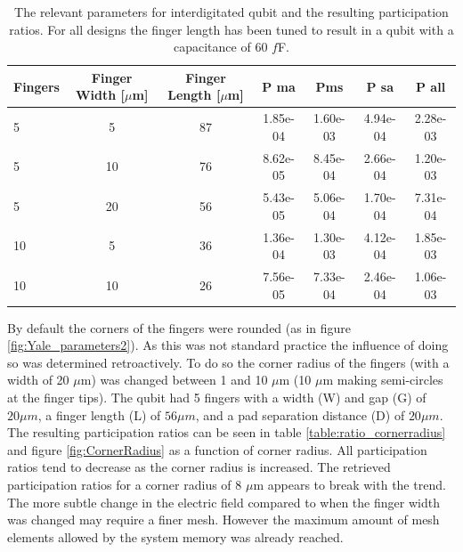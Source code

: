 \begin{table}
	\begin{center}
		\begin{tabular}{ | l || c | c || c | c | c | c |}
			\hline
			Fingers  & Finger Width [\(\mu\)m] & Finger Length [\(\mu\)m]  & P ma &  Pms & P sa & P all \\ \hline
			5 & 5 & 87 & 1.85e-04 & 1.60e-03 & 4.94e-04 & 2.28e-03 \\  
			5 & 10 & 76 & 8.62e-05 & 8.45e-04 & 2.66e-04 & 1.20e-03 \\
			5 & 20 & 56 & 5.43e-05 & 5.06e-04 & 1.70e-04 & 7.31e-04  \\
			10 & 5 & 36 & 1.36e-04 & 1.30e-03 & 4.12e-04 & 1.85e-03 \\
			10 & 10 & 26 & 7.56e-05 & 7.33e-04 & 2.46e-04 & 1.06e-03 \\
			\hline
		\end{tabular}
	\end{center}
	\caption{The relevant parameters for interdigitated qubit and the resulting participation ratios. For all designs the finger length has been tuned to result in a qubit with a capacitance of 60 \(f\)F. }
	\label{table:60fF_fingerlength}
\end{table}



By default the corners of the fingers were rounded (as in figure \ref{fig:Yale_parameters2}). As this was not standard practice the influence of doing so was determined retroactively. To do so the corner radius of the fingers (with a width of 20 \(\mu\)m) was changed between 1 and 10 \(\mu\)m (10 \(\mu\)m making semi-circles at the finger tips). The qubit had 5 fingers with a width (W) and gap (G) of \(20 \mu m\), a finger length (L) of \(56 \mu m\), and a pad separation distance (D) of \(20 \mu m\). The resulting participation ratios can be seen in table \ref{table:ratio_cornerradius} and figure \ref{fig:CornerRadius} as a function of corner radius. All participation ratios tend to decrease as the corner radius is increased. The retrieved participation ratios for a corner radius of 8 \(\mu\)m appears to break with the trend. The more subtle change in the electric field compared to when the finger width was changed may require a finer mesh. However the maximum amount of mesh elements allowed by the system memory was already reached.

